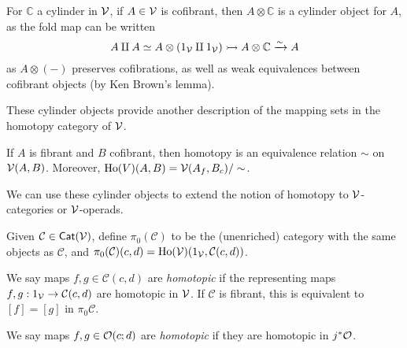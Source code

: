 \documentclass[a4paper,10pt
,draft
]{article}%
\renewcommand{\1}{\ensuremath{\mathbb{id}}}
\begin{document}
\begin{remark}
      \label{CYL_REM}
      For $\mathbb C$ a cylinder in $\mathcal V$,
      if $A \in \mathcal V$ is cofibrant, then $A \otimes \mathbb C$ is a cylinder object for $A$,
      as the fold map can be written
      \begin{equation}
            A \amalg A \simeq A \otimes (1_{\mathcal V} \amalg 1_{\mathcal V}) \rightarrowtail A \otimes \mathbb C \xrightarrow{\sim} A
      \end{equation}
      as $A \otimes (-)$ preserves cofibrations, as well as weak equivalences between cofibrant objects (by Ken Brown's lemma).
\end{remark}

These cylinder objects provide another description of the mapping sets in the homotopy category of $\mathcal V$.

\begin{proposition}       
      If $A$ is fibrant and $B$ cofibrant, then
      homotopy is an equivalence relation $\sim$ on $\mathcal V(A,B)$.
      Moreover, 
      $\operatorname{Ho}(V)(A,B) = \mathcal V(A_f, B_c)/\sim$.
\end{proposition}

We can use these cylinder objects to extend the notion of homotopy to $\mathcal V$-categories or $\mathcal V$-operads.

\begin{definition}
      \label{HTPY_DEFN}
      Given $\mathcal C \in \mathsf{Cat}(\mathcal V)$, define $\pi_0(\mathcal C)$ to be the (unenriched) category with
      the same objects as $\mathcal C$, and $\pi_0(\mathcal C)(c,d) = \operatorname{Ho}(\mathcal V)(1_{\mathcal V}, \mathcal C(c,d))$.

      We say maps $f,g \in \mathcal C(c,d)$ are \textit{homotopic}
      if the representing maps $f,g: 1_{\mathcal V} \to \mathcal C(c,d)$ are homotopic in $\mathcal V$.
      If $\mathcal C$ is fibrant, this is equivalent to $[f] = [g]$ in $\pi_0\mathcal C$.

      We say maps $f,g \in \mathcal{O}(c;d)$ are \textit{homotopic} if they are homotopic in $j^{\**}\O$. 
\end{definition}
\end{document}
